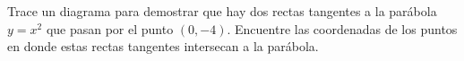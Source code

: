 \item Trace un diagrama para demostrar que hay dos rectas tangentes a la parábola $y = x^2$ que pasan por el punto $(0, -4)$. Encuentre las coordenadas de los puntos en donde estas rectas tangentes intersecan a la parábola.
